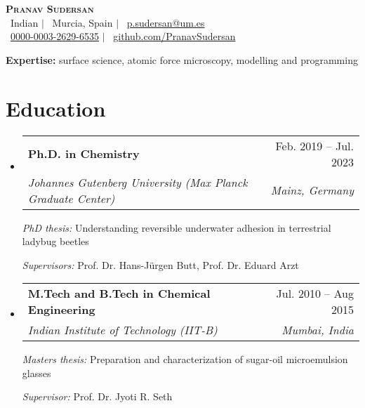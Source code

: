 \documentclass[letterpaper,11pt]{article}
\makeatletter
\newcommand{\resumeParagraph}[1]{
	\vspace{0pt}\par %
	\noindent\small{#1} \vspace{0pt} %
}
\newcommand{\resumeSubheading}[4]{
	\vspace{-2pt}\item
	\begin{tabular*}{0.97\textwidth}[t]{l@{\extracolsep{\fill}}r}
		\textbf{#1} & #2 \\
		\textit{\small#3} & \textit{\small #4} \\
	\end{tabular*}\vspace{-7pt}
}
\newcommand{\resumeSubHeadingListStart}{\begin{itemize}[leftmargin=0.15in, label={}]}
\newcommand{\resumeSubHeadingListEnd}{\end{itemize}}
\makeatother
\begin{document}
	
	

	\begin{center}
		\textbf{\Huge \scshape Pranav Sudersan} \\ \vspace{4pt}
		\small
		\faGlobe \, Indian $|$
		\faMapMarker \, Murcia, Spain $|$  %
		\faEnvelope \, \href{mailto:p.sudersan@um.es}{p.sudersan@um.es} \\%
		\faOrcid \, \href{https://orcid.org/0000-0003-2629-6535}{0000-0003-2629-6535} $|$  %
		\faGithub \, \href{https://github.com/PranavSudersan}{github.com/PranavSudersan}  %
	\end{center}
	
	\textbf{Expertise:} surface science, atomic force microscopy, modelling and programming
	
	\section{Education}
	\resumeSubHeadingListStart
	\resumeSubheading
	{Ph.D. in Chemistry}{Feb. 2019 -- Jul. 2023}
	{Johannes Gutenberg University (Max Planck Graduate Center)}{Mainz, Germany}
	\resumeParagraph{\emph{PhD thesis:} Understanding reversible underwater adhesion in terrestrial ladybug beetles}\vspace{-4pt}
	\resumeParagraph{\emph{Supervisors:} Prof. Dr. Hans-Jürgen Butt, Prof. Dr. Eduard Arzt}
	\resumeSubheading
	{M.Tech and B.Tech in Chemical Engineering}{Jul. 2010 -- Aug 2015}
	{Indian Institute of Technology (IIT-B)}{Mumbai, India}
	\resumeParagraph{\emph{Masters thesis:} Preparation and characterization of sugar-oil microemulsion glasses}\vspace{-4pt}
	\resumeParagraph{\emph{Supervisor:} Prof. Dr. Jyoti R. Seth}
	\resumeSubHeadingListEnd
	
\end{document}
